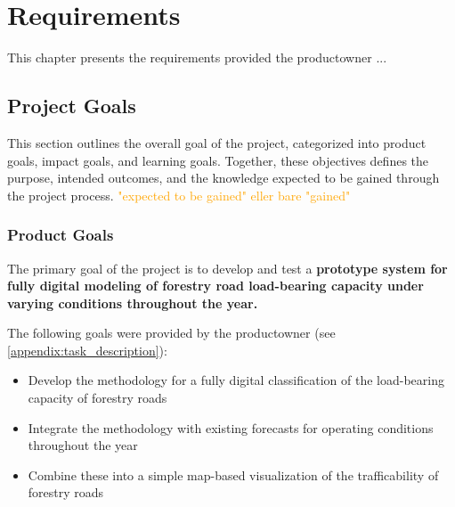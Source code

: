 \chapter{Requirements}\label{chap:requirements}

This chapter presents the requirements provided the \gls{productowner} ...

\section{Project Goals}

This section outlines the overall goal of the project, categorized into product goals, impact goals, and learning goals. Together, these objectives defines the purpose, intended outcomes, and the knowledge expected to be gained through the project process. \textcolor{orange}{"expected to be gained" eller bare "gained"}

\subsection{Product Goals}\label{subsec:req:productgoals}

The primary goal of the project is to develop and test a \textbf{prototype system for fully digital modeling of forestry road load-bearing capacity under varying conditions throughout the year.} 

The following goals were provided by the \Gls{productowner} (see \autoref{appendix:task_description}):
\begin{itemize}
    \item Develop the methodology for a fully digital classification of the load-bearing capacity of forestry roads
    \item Integrate the methodology with existing forecasts for operating conditions throughout the year
    \item Combine these into a simple map-based visualization of the trafficability of forestry roads
\end{itemize}


